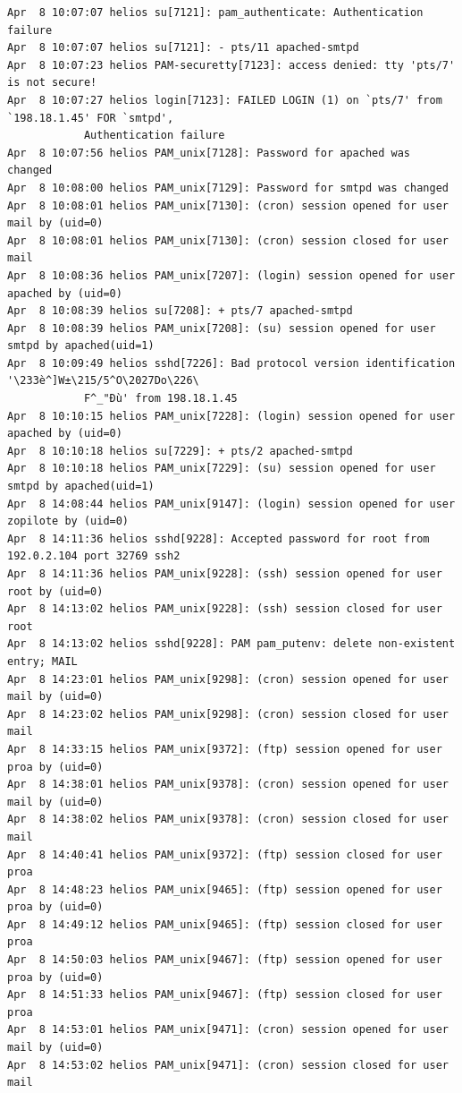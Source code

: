 \begin{lstlisting}[style=terminal]
Apr  8 10:07:07 helios su[7121]: pam_authenticate: Authentication failure
Apr  8 10:07:07 helios su[7121]: - pts/11 apached-smtpd
Apr  8 10:07:23 helios PAM-securetty[7123]: access denied: tty 'pts/7' is not secure!
Apr  8 10:07:27 helios login[7123]: FAILED LOGIN (1) on `pts/7' from `198.18.1.45' FOR `smtpd', 
            Authentication failure
Apr  8 10:07:56 helios PAM_unix[7128]: Password for apached was changed
Apr  8 10:08:00 helios PAM_unix[7129]: Password for smtpd was changed
Apr  8 10:08:01 helios PAM_unix[7130]: (cron) session opened for user mail by (uid=0)
Apr  8 10:08:01 helios PAM_unix[7130]: (cron) session closed for user mail
Apr  8 10:08:36 helios PAM_unix[7207]: (login) session opened for user apached by (uid=0)
Apr  8 10:08:39 helios su[7208]: + pts/7 apached-smtpd
Apr  8 10:08:39 helios PAM_unix[7208]: (su) session opened for user smtpd by apached(uid=1)
Apr  8 10:09:49 helios sshd[7226]: Bad protocol version identification '\233è^]W±\215/5^O\2027Do\226\
            F^_"Ðù' from 198.18.1.45
Apr  8 10:10:15 helios PAM_unix[7228]: (login) session opened for user apached by (uid=0)
Apr  8 10:10:18 helios su[7229]: + pts/2 apached-smtpd
Apr  8 10:10:18 helios PAM_unix[7229]: (su) session opened for user smtpd by apached(uid=1)
Apr  8 14:08:44 helios PAM_unix[9147]: (login) session opened for user zopilote by (uid=0)
Apr  8 14:11:36 helios sshd[9228]: Accepted password for root from 192.0.2.104 port 32769 ssh2
Apr  8 14:11:36 helios PAM_unix[9228]: (ssh) session opened for user root by (uid=0)
Apr  8 14:13:02 helios PAM_unix[9228]: (ssh) session closed for user root
Apr  8 14:13:02 helios sshd[9228]: PAM pam_putenv: delete non-existent entry; MAIL
Apr  8 14:23:01 helios PAM_unix[9298]: (cron) session opened for user mail by (uid=0)
Apr  8 14:23:02 helios PAM_unix[9298]: (cron) session closed for user mail
Apr  8 14:33:15 helios PAM_unix[9372]: (ftp) session opened for user proa by (uid=0)
Apr  8 14:38:01 helios PAM_unix[9378]: (cron) session opened for user mail by (uid=0)
Apr  8 14:38:02 helios PAM_unix[9378]: (cron) session closed for user mail
Apr  8 14:40:41 helios PAM_unix[9372]: (ftp) session closed for user proa
Apr  8 14:48:23 helios PAM_unix[9465]: (ftp) session opened for user proa by (uid=0)
Apr  8 14:49:12 helios PAM_unix[9465]: (ftp) session closed for user proa
Apr  8 14:50:03 helios PAM_unix[9467]: (ftp) session opened for user proa by (uid=0)
Apr  8 14:51:33 helios PAM_unix[9467]: (ftp) session closed for user proa
Apr  8 14:53:01 helios PAM_unix[9471]: (cron) session opened for user mail by (uid=0)
Apr  8 14:53:02 helios PAM_unix[9471]: (cron) session closed for user mail

\end{lstlisting}
